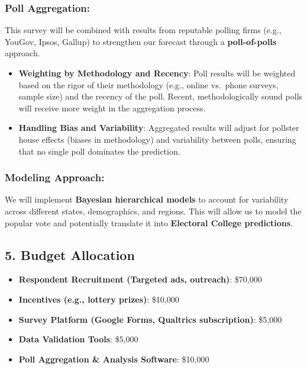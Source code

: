 \documentclass[
  letterpaper,
  DIV=11,
  numbers=noendperiod]{scrartcl}
\providecommand{\tightlist}{%
  \setlength{\itemsep}{0pt}\setlength{\parskip}{0pt}}\usepackage{longtable,booktabs,array}
\begin{document}
\subsubsection{\texorpdfstring{\textbf{Poll
Aggregation}:}{Poll Aggregation:}}\label{poll-aggregation}

This survey will be combined with results from reputable polling firms
(e.g., YouGov, Ipsos, Gallup) to strengthen our forecast through a
\textbf{poll-of-polls} approach.

\begin{itemize}
\tightlist
\item
  \textbf{Weighting by Methodology and Recency}: Poll results will be
  weighted based on the rigor of their methodology (e.g., online
  vs.~phone surveys, sample size) and the recency of the poll. Recent,
  methodologically sound polls will receive more weight in the
  aggregation process.
\item
  \textbf{Handling Bias and Variability}: Aggregated results will adjust
  for pollster house effects (biases in methodology) and variability
  between polls, ensuring that no single poll dominates the prediction.
\end{itemize}

\subsubsection{\texorpdfstring{\textbf{Modeling
Approach}:}{Modeling Approach:}}\label{modeling-approach}

We will implement \textbf{Bayesian hierarchical models} to account for
variability across different states, demographics, and regions. This
will allow us to model the popular vote and potentially translate it
into \textbf{Electoral College predictions}.

\subsection{\texorpdfstring{\textbf{5. Budget
Allocation}}{5. Budget Allocation}}\label{budget-allocation}

\begin{itemize}
\tightlist
\item
  \textbf{Respondent Recruitment (Targeted ads, outreach)}: \$70,000\\
\item
  \textbf{Incentives (e.g., lottery prizes)}: \$10,000\\
\item
  \textbf{Survey Platform (Google Forms, Qualtrics subscription)}:
  \$5,000\\
\item
  \textbf{Data Validation Tools}: \$5,000\\
\item
  \textbf{Poll Aggregation \& Analysis Software}: \$10,000
\end{itemize}
\end{document}
